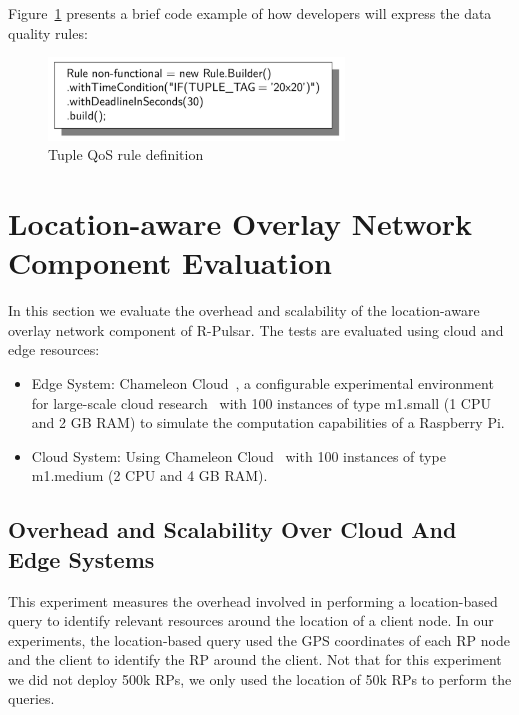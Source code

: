 Figure~\ref{fig:qosRule} presents a brief code example of how developers will express the data quality rules:

\begin{figure}[h!]
  \centering
  \includegraphics[width=0.7\textwidth]{Figures/qosRule.pdf}
  \caption{Tuple QoS rule definition}\label{fig:qosRule}
\end{figure}


\section{Location-aware Overlay Network Component Evaluation}

In this section we evaluate the overhead and scalability of the location-aware overlay network component of R-Pulsar. The tests are evaluated using cloud and edge resources:

\begin{itemize}
\item Edge System:  Chameleon Cloud~\cite{chameleon}, a configurable experimental environment for large-scale cloud research~\cite{chameleon} with 100 instances of type m1.small (1 CPU and 2 GB RAM) to simulate the computation capabilities of a Raspberry Pi.

\item Cloud System: Using Chameleon Cloud~\cite{chameleon} with 100 instances of type m1.medium (2 CPU and 4 GB RAM).
\end{itemize}

\subsection{Overhead and Scalability Over Cloud And Edge Systems}

This experiment measures the overhead involved in performing a location-based query to identify relevant resources around the location of a client node. In our experiments, the location-based query used the GPS coordinates of each RP node and the client to identify the RP around the client. Not that for this experiment we did not deploy 500k RPs, we only used the location of 50k RPs to perform the queries.

